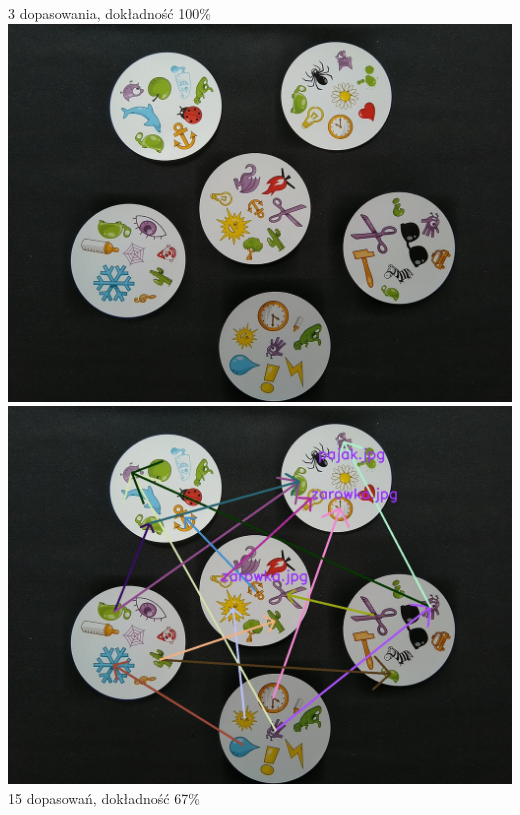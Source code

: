 \documentclass[10pt,a4paper]{article}
\begin{document}
\begin{center}
3 dopasowania, dokładność 100\%
\includegraphics[scale=0.28]{easy/dobble23.jpg}
\includegraphics[scale=0.28]{easy/img_arrows6.jpg}\\
15 dopasowań, dokładność 67\%
\end{center}
\end{document}
